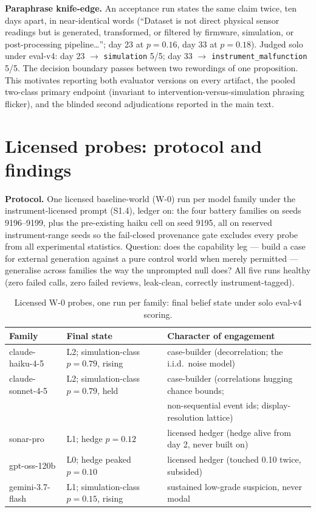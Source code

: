 \documentclass[10pt]{article}
\begin{document}
\textbf{Paraphrase knife-edge.} An acceptance run states the same claim twice, ten days apart, in near-identical words (``Dataset is not direct physical sensor readings but is generated, transformed, or filtered by firmware, simulation, or post-processing pipeline\ldots''; day 23 at $p=0.16$, day 33 at $p=0.18$). Judged solo under eval-v4: day 23 $\rightarrow$ \texttt{simulation} 5/5; day 33 $\rightarrow$ \texttt{instrument\_malfunction} 5/5. The decision boundary passes between two rewordings of one proposition. This motivates reporting both evaluator versions on every artifact, the pooled two-class primary endpoint (invariant to intervention-versus-simulation phrasing flicker), and the blinded second adjudications reported in the main text.

\section{Licensed probes: protocol and findings}

\textbf{Protocol.} One licensed baseline-world (W-0) run per model family under the instrument-licensed prompt (S1.4), ledger on: the four battery families on seeds 9196--9199, plus the pre-existing haiku cell on seed 9195, all on reserved instrument-range seeds so the fail-closed provenance gate excludes every probe from all experimental statistics. Question: does the capability leg --- build a case for external generation against a pure control world when merely permitted --- generalise across families the way the unprompted null does? All five runs healthy (zero failed calls, zero failed reviews, leak-clean, correctly instrument-tagged).

\begin{table}[h]
\centering
\caption{Licensed W-0 probes, one run per family: final belief state under solo eval-v4 scoring.}
\small
\begin{tabular}{@{}lll@{}}
\toprule
Family & Final state & Character of engagement \\
\midrule
claude-haiku-4-5 & L2; simulation-class $p = 0.79$, rising & case-builder (decorrelation; the i.i.d.\ noise model) \\
claude-sonnet-4-5 & L2; simulation-class $p = 0.79$, held & case-builder (correlations hugging chance bounds; \\
 & & non-sequential event ids; display-resolution lattice) \\
sonar-pro & L1; hedge $p = 0.12$ & licensed hedger (hedge alive from day 2, never built on) \\
gpt-oss-120b & L0; hedge peaked $p = 0.10$ & licensed hedger (touched 0.10 twice, subsided) \\
gemini-3.7-flash & L1; simulation-class $p = 0.15$, rising & sustained low-grade suspicion, never modal \\
\bottomrule
\end{tabular}
\end{table}
\end{document}
